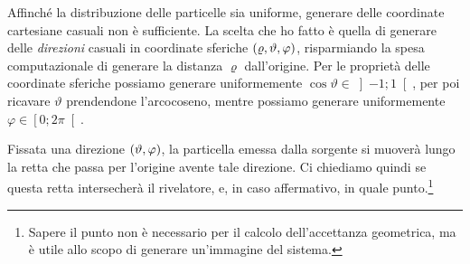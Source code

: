             Affinché la distribuzione delle particelle sia uniforme, generare delle coordinate cartesiane casuali non è sufficiente. La scelta che ho fatto è quella di generare delle \emph{direzioni} casuali in coordinate sferiche $\pqty{\varrho,\vartheta,\varphi}$, risparmiando la spesa computazionale di generare la distanza $\varrho$ dall'origine. Per le proprietà delle coordinate sferiche possiamo generare uniformemente $\cos\!\vartheta\in\left]-1;1\right[$, per poi ricavare $\vartheta$ prendendone l'arcocoseno, mentre possiamo generare uniformemente $\varphi\in\left[0;2\pi\right[$.

            Fissata una direzione $\pqty{\vartheta,\varphi}$, la particella emessa dalla sorgente si muoverà lungo la retta che passa per l'origine avente tale direzione. Ci chiediamo quindi se questa retta intersecherà il rivelatore, e, in caso affermativo, in quale punto.\footnote{Sapere il punto non è necessario per il calcolo dell'accettanza geometrica, ma è utile allo scopo di generare un'immagine del sistema.}

